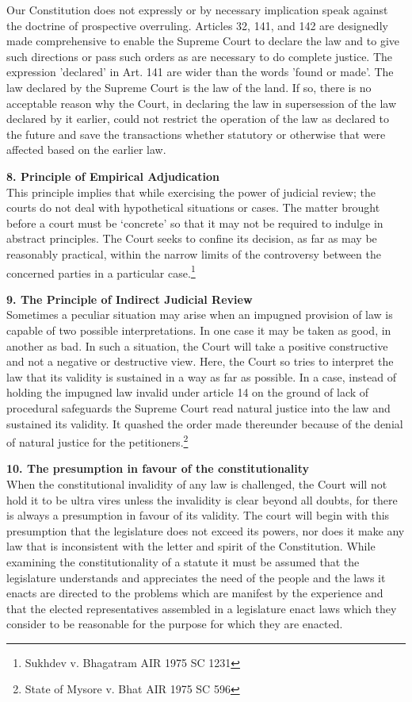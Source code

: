 \begin{multicols}{2}
\noi
Our Constitution does not expressly or by necessary implication speak against the
doctrine of prospective overruling. Articles 32, 141, and 142 are designedly made
comprehensive to enable the Supreme Court to declare the law and to give such
directions or pass such orders as are necessary to do complete justice. The expression
'declared' in Art. 141 are wider than the words 'found or made'. The law declared by the
Supreme Court is the law of the land. If so, there is no acceptable reason why the Court,
in declaring the law in supersession of the law declared by it earlier, could not restrict
the operation of the law as declared to the future and save the transactions whether
statutory or otherwise that were affected based on the earlier law.

\noi
{\bf 8. Principle of Empirical Adjudication}\\[0.2cm]
This principle implies that while exercising the power of judicial review; the courts do
not deal with hypothetical situations or cases. The matter brought before a court must
be ‘concrete’ so that it may not be required to indulge in abstract principles. The Court
seeks to confine its decision, as far as may be reasonably practical, within the narrow
limits of the controversy between the concerned parties in a particular case.\footnote{Sukhdev v. Bhagatram AIR 1975 SC 1231}

\noi
{\bf 9. The Principle of Indirect Judicial Review}\\[0.2cm] Sometimes a peculiar situation may arise when an impugned provision of law is capable
of two possible interpretations. In one case it may be taken as good, in another as bad.
In such a situation, the Court will take a positive constructive and not a negative or
destructive view. Here, the Court so tries to interpret the law that its validity is sustained
in a way as far as possible. In a case, instead of holding the impugned law invalid under
article 14 on the ground of lack of procedural safeguards the Supreme Court read
natural justice into the law and sustained its validity. It quashed the order made
thereunder because of the denial of natural justice for the petitioners.\footnote{ State of Mysore v. Bhat AIR 1975 SC 596}

\noi
{\bf 10. The presumption in favour of the constitutionality}\\[0.2cm] When the constitutional invalidity of any law is challenged, the Court will not hold it
to be ultra vires unless the invalidity is clear beyond all doubts, for there is always a
presumption in favour of its validity. The court will begin with this presumption that
the legislature does not exceed its powers, nor does it make any law that is inconsistent
with the letter and spirit of the Constitution. While examining the constitutionality of
a statute it must be assumed that the legislature understands and appreciates the need
of the people and the laws it enacts are directed to the problems which are manifest by
the experience and that the elected representatives assembled in a legislature enact laws
which they consider to be reasonable for the purpose for which they are enacted.


\end{multicols}
